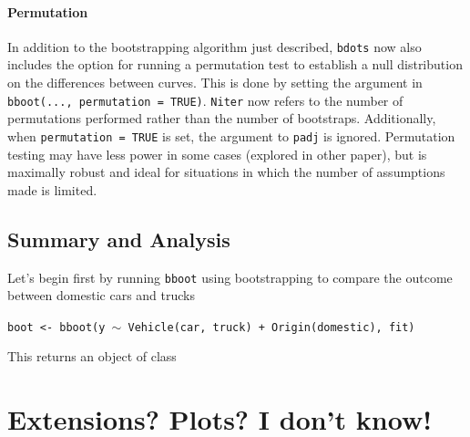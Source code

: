 \documentclass{article}
\newcommand{\xt}{\texttt}%
\begin{document}
\paragraph{Permutation} In addition to the bootstrapping algorithm just described, 
\xt{bdots} now also includes the option for running a permutation test to establish a null distribution on the differences between curves. This is done by setting the argument in \xt{bboot(..., permutation = TRUE)}.  \xt{Niter} now refers to the number of permutations performed rather than the number of bootstraps. Additionally, when \xt{permutation = TRUE} is set, the argument to \xt{padj} is ignored. Permutation testing may have less power in some cases (explored in other paper), but is maximally robust and ideal for situations in which the number of assumptions made is limited.

\subsection{Summary and Analysis}

Let's begin first by running \xt{bboot} using bootstrapping to compare the outcome between  domestic cars and trucks

\begin{center}
\tt boot <- bboot(y $\sim$ Vehicle(car, truck) + Origin(domestic), fit)
\end{center}

This returns an object of class 






\section{Extensions? Plots? I don't know!}
\end{document}

